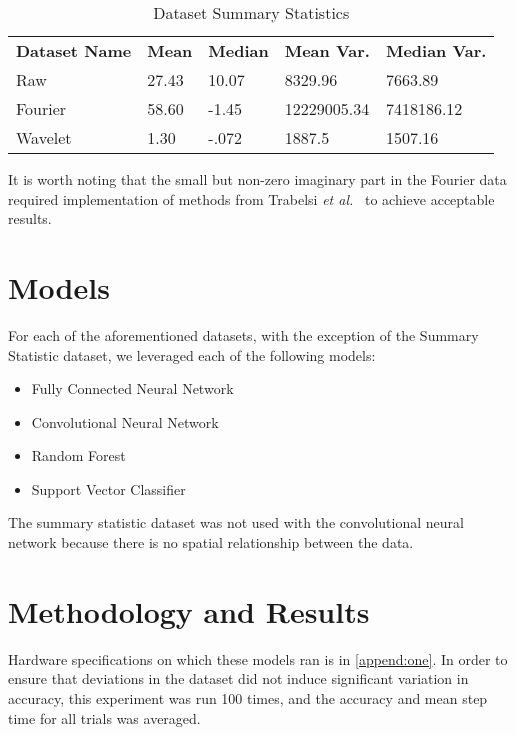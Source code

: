 \renewcommand{\thefootnote}{*} 
\begin{table}[h]
\caption{Dataset Summary Statistics}
\centering
\label{Tab:summary}	
\begin{tabular}{l|llll}
\textbf{Dataset Name} & \textbf{Mean} & \textbf{Median} & \textbf{Mean Var.} & \textbf{Median Var.} \\\cline{1-5}
Raw         & 27.43    & 10.07    & 8329.96    & 7663.89 \\
Fourier       & 58.60\footnotemark    & -1.45    & 12229005.34    & 7418186.12 \\
Wavelet        & 1.30    & -.072    & 1887.5    & 1507.16 \\             
\end{tabular}
\end{table}

\renewcommand{\thefootnote}{1}
It is worth noting that the small but non-zero imaginary part in the Fourier data required implementation of methods from Trabelsi \textit{et al.}~\cite{trabelsi2017deep} to achieve acceptable results.

\section{Models}
For each of the aforementioned datasets, with the exception of the Summary Statistic dataset, we leveraged each of the following models:
\begin{itemize}
\item Fully Connected Neural Network
\item Convolutional Neural Network
\item Random Forest
\item Support Vector Classifier	
\end{itemize}

The summary statistic dataset was not used with the convolutional neural network because there is no spatial relationship between the data.


\section{Methodology and Results}
Hardware specifications on which these models ran is in \ref{append:one}.
In order to ensure that deviations in the dataset did not induce significant variation in accuracy, this experiment was run 100 times, and the accuracy and mean step time for all trials was averaged.

